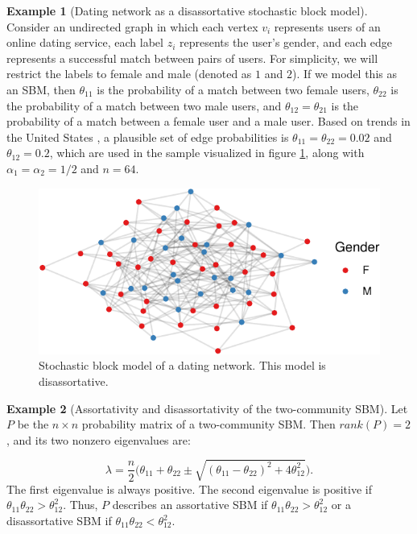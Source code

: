 \documentclass[
  11pt,
]{article}
\theoremstyle{definition}
\theoremstyle{definition}
\newtheorem{example}{Example}[section]
\theoremstyle{definition}
\theoremstyle{definition}
\theoremstyle{remark}
\begin{document}
\begin{example}[Dating network as a disassortative stochastic block model]
\label{ex:sbm-dating}
Consider an undirected graph in which each vertex $v_i$ represents users of an online dating service, each label $z_i$ represents the user's gender, and each edge represents a successful match between pairs of users. 
For simplicity, we will restrict the labels to female and male (denoted as $1$ and $2$). 
If we model this as an SBM, then $\theta_{11}$ is the probability of a match between two female users, $\theta_{22}$ is the probability of a match between two male users, and $\theta_{12} = \theta_{21}$ is the probability of a match between a female user and a male user. Based on trends in the United States \citep{gallup-lgbt}, 
a plausible set of edge probabilities is $\theta_{11} = \theta_{22} = 0.02$ and $\theta_{12} = 0.2$, which are used in the sample visualized in figure \ref{fig:dating-sbm}, along with $\alpha_1 = \alpha_2 = 1/2$ and $n = 64$.

\begin{figure}[H]

{\centering \includegraphics{draft_files/figure-latex/dating-sbm-1} 

}

\caption{Stochastic block model of a dating network. This model is disassortative.}\label{fig:dating-sbm}
\end{figure}
\end{example}

\begin{example}[Assortativity and disassortativity of the two-community SBM]
Let $P$ be the $n \times n$ probability matrix of a two-community SBM. 
Then $rank(P) = 2$, and its two nonzero eigenvalues are:

$$
\lambda = \frac{n}{2} \bigg( 
  \theta_{11} + \theta_{22} \pm 
  \sqrt{(\theta_{11} - \theta_{22})^2 + 4 \theta_{12}^2} 
\bigg).
$$
The first eigenvalue is always positive. 
The second eigenvalue is positive if $\theta_{11} \theta_{22} > \theta_{12}^2$. 
Thus, $P$ describes an assortative SBM if $\theta_{11} \theta_{22} > \theta_{12}^2$ or 
a disassortative SBM if $\theta_{11} \theta_{22} < \theta_{12}^2$. 
\end{example}
\end{document}
